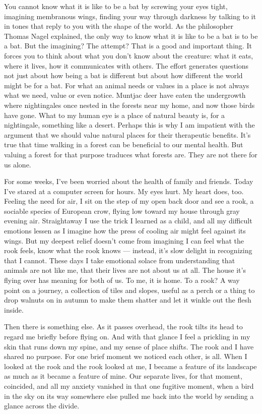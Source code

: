 You cannot know what it is like to be a bat by screwing your eyes tight,
imagining membranous wings, finding your way through darkness by talking
to it in tones that reply to you with the shape of the world. As the
philosopher Thomas Nagel explained, the only way to know what it is like
to be a bat is to be a bat. But the imagining? The attempt? That is a
good and important thing. It forces you to think about what you don't
know about the creature: what it eats, where it lives, how it
communicates with others. The effort generates questions not just about
how being a bat is different but about how different the world might be
for a bat. For what an animal needs or values in a place is not always
what we need, value or even notice. Muntjac deer have eaten the
undergrowth where nightingales once nested in the forests near my home,
and now those birds have gone. What to my human eye is a place of
natural beauty is, for a nightingale, something like a desert. Perhaps
this is why I am impatient with the argument that we should value
natural places for their therapeutic benefits. It's true that time
walking in a forest can be beneficial to our mental health. But valuing
a forest for that purpose traduces what forests are. They are not there
for us alone.

For some weeks, I've been worried about the health of family and
friends. Today I've stared at a computer screen for hours. My eyes hurt.
My heart does, too. Feeling the need for air, I sit on the step of my
open back door and see a rook, a sociable species of European crow,
flying low toward my house through gray evening air. Straightaway I use
the trick I learned as a child, and all my difficult emotions lessen as
I imagine how the press of cooling air might feel against its wings. But
my deepest relief doesn't come from imagining I can feel what the rook
feels, know what the rook knows --- instead, it's slow delight in
recognizing that I cannot. These days I take emotional solace from
understanding that animals are not like me, that their lives are not
about us at all. The house it's flying over has meaning for both of us.
To me, it is home. To a rook? A way point on a journey, a collection of
tiles and slopes, useful as a perch or a thing to drop walnuts on in
autumn to make them shatter and let it winkle out the flesh inside.

Then there is something else. As it passes overhead, the rook tilts its
head to regard me briefly before flying on. And with that glance I feel
a prickling in my skin that runs down my spine, and my sense of place
shifts. The rook and I have shared no purpose. For one brief moment we
noticed each other, is all. When I looked at the rook and the rook
looked at me, I became a feature of its landscape as much as it became a
feature of mine. Our separate lives, for that moment, coincided, and all
my anxiety vanished in that one fugitive moment, when a bird in the sky
on its way somewhere else pulled me back into the world by sending a
glance across the divide.

